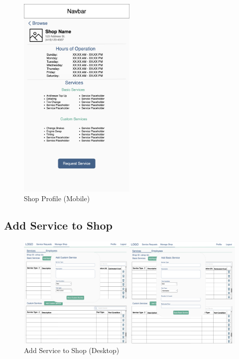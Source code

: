 \documentclass[12pt, titlepage]{article}
\begin{document}
\begin{figure}[H]
	\centering
	\includegraphics[width=0.5\textwidth]{mockups/Shop Profile (Mobile).png}
	\caption{Shop Profile (Mobile)}
\end{figure}

\subsection{Add Service to Shop}

\begin{figure}[H]
	\centering
	\includegraphics[width=\textwidth]{mockups/Service Form (Shop Settings) (Desktop).png}
	\caption{Add Service to Shop (Desktop)}
\end{figure}
\end{document}
